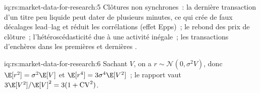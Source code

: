 \begin{solution}{iq:rs:market-data-for-research:5}
Clôtures non synchrones~: la dernière transaction d'un titre peu liquide peut dater de plusieurs minutes, ce qui crée de faux décalages lead--lag et réduit
les corrélations (effet Epps)~; le rebond des prix de clôture~; l'hétéroscédasticité due à une activité inégale~; les transactions d'enchères dans les premières
et dernières .
\end{solution}

\begin{solution}{iq:rs:market-data-for-research:6}
Sachant $V$, on a $r \sim \mathcal N(0, \sigma^2V)$, donc $\E[r^2] = \sigma^2\E[V]$ et $\E[r^4] = 3\sigma^4\E[V^2]$~; le rapport vaut $3\E[V^2]/\E[V]^2
= 3(1 + \mathrm{CV}^2)$.
\end{solution}
